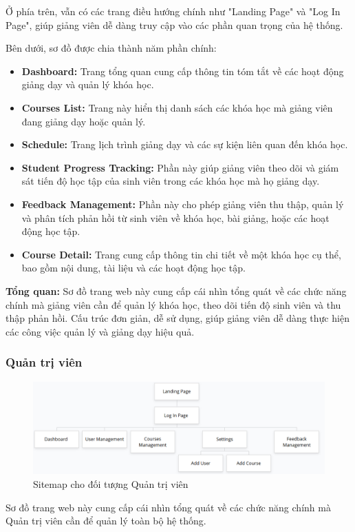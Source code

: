 \par Ở phía trên, vẫn có các trang điều hướng chính như "Landing Page" và "Log In Page", giúp giảng viên dễ dàng truy cập vào các phần quan trọng của hệ thống.

\par Bên dưới, sơ đồ được chia thành năm phần chính:

\begin{itemize}
    \item \textbf{Dashboard:} Trang tổng quan cung cấp thông tin tóm tắt về các hoạt động giảng dạy và quản lý khóa học.
    \item \textbf{Courses List:} Trang này hiển thị danh sách các khóa học mà giảng viên đang giảng dạy hoặc quản lý.
    \item \textbf{Schedule:} Trang lịch trình giảng dạy và các sự kiện liên quan đến khóa học.
    \item \textbf{Student Progress Tracking:} Phần này giúp giảng viên theo dõi và giám sát tiến độ học tập của sinh viên trong các khóa học mà họ giảng dạy.
    \item \textbf{Feedback Management:} Phần này cho phép giảng viên thu thập, quản lý và phân tích phản hồi từ sinh viên về khóa học, bài giảng, hoặc các hoạt động học tập.
    \item \textbf{Course Detail:} Trang cung cấp thông tin chi tiết về một khóa học cụ thể, bao gồm nội dung, tài liệu và các hoạt động học tập.
\end{itemize}

\par \textbf{Tổng quan:} Sơ đồ trang web này cung cấp cái nhìn tổng quát về các chức năng chính mà giảng viên cần để quản lý khóa học, theo dõi tiến độ sinh viên và thu thập phản hồi. Cấu trúc đơn giản, dễ sử dụng, giúp giảng viên dễ dàng thực hiện các công việc quản lý và giảng dạy hiệu quả.
\subsubsection{Quản trị viên}
\begin{figure}[H]
    \centering
    \includegraphics[scale=0.55]{Images/sitemap/Manager.png}
    \caption{Sitemap cho đối tượng Quản trị viên}
    \label{fig:enter-label}
\end{figure}
\par Sơ đồ trang web này cung cấp cái nhìn tổng quát về các chức năng chính mà Quản trị viên cần để quản lý toàn bộ hệ thống.

